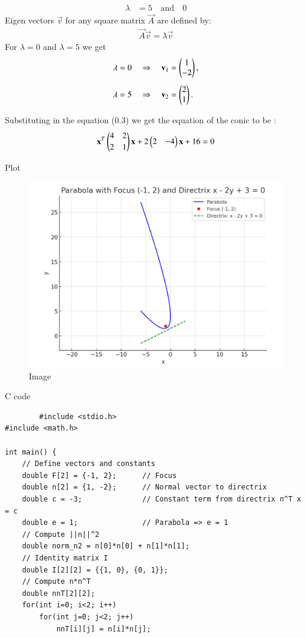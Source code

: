 \documentclass{beamer}
\begin{document}
\begin{frame}
\begin{align}
    \lambda &= 5 \quad \text{and} \quad 0
\end{align}
    Eigen vectors $\vec{v}$ for any square matrix $\vec{A}$ are defined by:
\begin{align}
    \vec{A}\vec{v} = \lambda\vec{v}
\end{align}
For $\lambda = 0$ and $\lambda=5$ we get
\begin{align}
    \lambda = 0 &\quad\Rightarrow\quad \mathbf{v}_1 = \begin{pmatrix}1\\-2\end{pmatrix},\\[4pt]
    \lambda = 5 &\quad\Rightarrow\quad \mathbf{v}_2 = \begin{pmatrix}2\\1\end{pmatrix}.
\end{align}

Substituting in the equation (0.3) we get the equation of the conic to be :
\begin{align}
  \mathbf{x}^{T}\begin{pmatrix}4 & 2\\[2pt] 2 & 1\end{pmatrix}\mathbf{x} + 2\begin{pmatrix}2 & -4\end{pmatrix}\mathbf{x} +16 =0
\end{align}
\end{frame}

\begin{frame}{Plot}
    \begin{figure}
        \centering
        \includegraphics[width=0.85\linewidth]{figs/image.png}
        \caption{Image}
        \label{fig:placeholder}
    \end{figure}
\end{frame}

\begin{frame}[fragile]{C code}
    \begin{lstlisting}
        #include <stdio.h>
#include <math.h>

int main() {
    // Define vectors and constants
    double F[2] = {-1, 2};      // Focus
    double n[2] = {1, -2};      // Normal vector to directrix
    double c = -3;              // Constant term from directrix n^T x = c
    double e = 1;               // Parabola => e = 1
    // Compute ||n||^2
    double norm_n2 = n[0]*n[0] + n[1]*n[1];
    // Identity matrix I
    double I[2][2] = {{1, 0}, {0, 1}};
    // Compute n*n^T
    double nnT[2][2];
    for(int i=0; i<2; i++)
        for(int j=0; j<2; j++)
            nnT[i][j] = n[i]*n[j];
    \end{lstlisting}
\end{frame}
\end{document}
